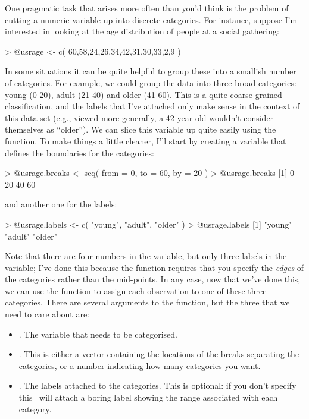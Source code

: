 One pragmatic task that arises more often than you'd think is the problem of cutting a numeric variable up into discrete categories. For instance, suppose I'm interested in looking at the age distribution of people at a social gathering:
\begin{rblock1}
> @usr{age <- c( 60,58,24,26,34,42,31,30,33,2,9 )}
\end{rblock1}
In some situations it can be quite helpful to group these into a smallish number of categories. For example, we could group the data into three broad categories: young (0-20), adult (21-40) and older (41-60). This is a quite coarse-grained classification, and the labels that I've attached only make sense in the context of this data set (e.g., viewed more generally, a 42 year old wouldn't consider themselves as ``older''). We can slice this variable up quite easily using the  function. To make things a little cleaner, I'll start by creating a variable that defines the boundaries for the categories:
\begin{rblock1}
> @usr{age.breaks <- seq( from = 0, to = 60, by = 20 )}
> @usr{age.breaks} 
[1]  0 20 40 60
\end{rblock1}
and another one for the labels:
\begin{rblock1}
> @usr{age.labels <- c( "young", "adult", "older" )}
> @usr{age.labels}
[1] "young" "adult" "older"
\end{rblock1}
Note that there are four numbers in the  variable, but only three labels in the  variable; I've done this because the  function requires that you specify the {\it edges} of the categories rather than the mid-points. In any case, now that we've done this, we can use the  function to assign each observation to one of these three categories. There are several arguments to the  function, but the three that we need to care about are:
\begin{itemize} \itemsep 0pt
\item {}. The variable that needs to be categorised. 
\item {}. This is either a vector containing the locations of the breaks separating the categories, or a number indicating how many categories you want.
\item {}. The labels attached to the categories. This is optional: if you don't specify this \R\ will attach a boring label showing the range associated with each category.
\end{itemize}
